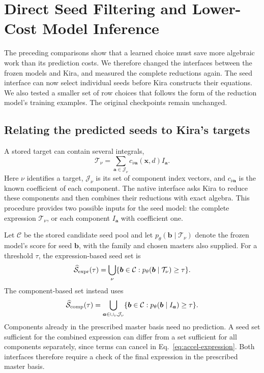 \section{Direct Seed Filtering and Lower-Cost Model Inference}
\label{sec:native-acceleration}
The preceding comparisons show that a learned choice must save more
algebraic work than its prediction costs. We therefore changed the
interfaces between the frozen models and Kira, and measured the complete
reductions again. The seed interface can now select individual seeds
before Kira constructs their equations. We also tested a smaller set of
row choices that follows the form of the reduction model's training
examples. The original checkpoints remain unchanged.

\subsection{Relating the predicted seeds to Kira's targets}
A stored target can contain several integrals,
\begin{equation}
 \mathcal T_\nu=\sum_{\boldsymbol a\in\mathcal J_\nu}
 c_{\nu\boldsymbol a}(\boldsymbol x,d)I_{\boldsymbol a}.
 \label{eq:accel-expression}
\end{equation}
Here $\nu$ identifies a target, $\mathcal J_\nu$ is its set of component index vectors, and
$c_{\nu\boldsymbol a}$ is the known coefficient of each component.
The native interface asks Kira to reduce these components and then
combines their reductions with exact algebra. This procedure provides
two possible inputs for the seed model: the complete expression $\mathcal T_\nu$,
or each component $I_{\boldsymbol a}$ with coefficient one.

Let $\mathcal C$ be the stored candidate seed pool and let
$p_\theta(\boldsymbol b\mid \mathcal T_\nu)$ denote the frozen model's score for
seed $\boldsymbol b$, with the family and chosen masters also supplied.
For a threshold $\tau$, the expression-based seed set is
\begin{equation}
 \widehat{\mathcal S}_{\rm expr}(\tau)
 =\bigcup_\nu\{\boldsymbol b\in\mathcal C:
             p_\theta(\boldsymbol b\mid \mathcal T_\nu)\geq\tau\}.
\end{equation}
The component-based set instead uses
\begin{equation}
 \widehat{\mathcal S}_{\rm comp}(\tau)
 =\bigcup_{\boldsymbol a\in\cup_\nu\mathcal J_\nu}
 \{\boldsymbol b\in\mathcal C:
       p_\theta(\boldsymbol b\mid I_{\boldsymbol a})\geq\tau\}.
\end{equation}
Components already in the prescribed master basis need no prediction.
A seed set sufficient for the combined expression can differ from a set
sufficient for all components separately, since terms can cancel in
Eq.~\eqref{eq:accel-expression}. Both interfaces therefore require a
check of the final expression in the prescribed master basis.

